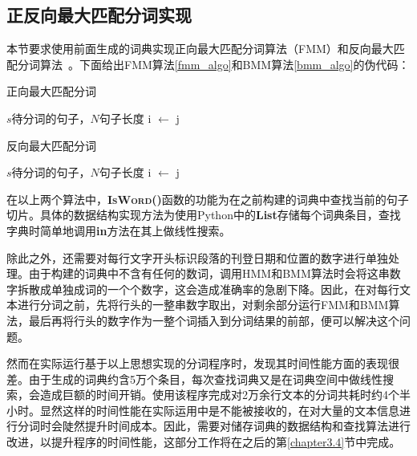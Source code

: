 \documentclass[11pt,a4paper]{article}
\begin{document}
	\subsection{正反向最大匹配分词实现}\label{chapter3.2}
	\noindent
	本节要求使用前面生成的词典实现正向最大匹配分词算法（FMM）和反向最大匹配分词算法~\citep{edmonds1965maximum}。下面给出FMM算法\ref{fmm_algo}和BMM算法\ref{bmm_algo}的伪代码：
	\renewcommand{\algorithmicrequire}{\textbf{输入:}}  
	\renewcommand{\algorithmicensure}{\textbf{输出:}}  
	\begin{algorithm}[h]
		\caption{正向最大匹配分词}\label{fmm_algo}
		\begin{algorithmic}[1] %
			\Require $s$待分词的句子，$N$句子长度
						\State {}
						\State i $\gets$ j
					\EndIf
				\EndFor
				\State {}
			\EndFor
			\EndFunction  
		\end{algorithmic}  
	\end{algorithm}

	\begin{algorithm}[t]
		\caption{反向最大匹配分词}\label{bmm_algo}
		\begin{algorithmic}[1] %
			\Require $s$待分词的句子，$N$句子长度
						\State {}
						\State i $\gets$ j
					\EndIf
				\EndFor
				\State {}
			\EndFor
			\EndFunction  
		\end{algorithmic}  
	\end{algorithm}

	在以上两个算法中，{\bfseries\scshape IsWord()}函数的功能为在之前构建的词典中查找当前的句子切片。具体的数据结构实现方法为使用Python中的{\bfseries List}存储每个词典条目，查找字典时简单地调用{\bfseries in}方法在其上做线性搜索。
	
	除此之外，还需要对每行文字开头标识段落的刊登日期和位置的数字进行单独处理。由于构建的词典中不含有任何的数词，调用HMM和BMM算法时会将这串数字拆散成单独成词的一个个数字，这会造成准确率的急剧下降。因此，在对每行文本进行分词之前，先将行头的一整串数字取出，对剩余部分运行FMM和BMM算法，最后再将行头的数字作为一整个词插入到分词结果的前部，便可以解决这个问题。
	
	然而在实际运行基于以上思想实现的分词程序时，发现其时间性能方面的表现很差。由于生成的词典约含5万个条目，每次查找词典又是在词典空间中做线性搜索，会造成巨额的时间开销。使用该程序完成对2万余行文本的分词共耗时约4个半小时。显然这样的时间性能在实际运用中是不能被接收的，在对大量的文本信息进行分词时会陡然提升时间成本。因此，需要对储存词典的数据结构和查找算法进行改进，以提升程序的时间性能，这部分工作将在之后的第\ref{chapter3.4}节中完成。
	
\end{document}
